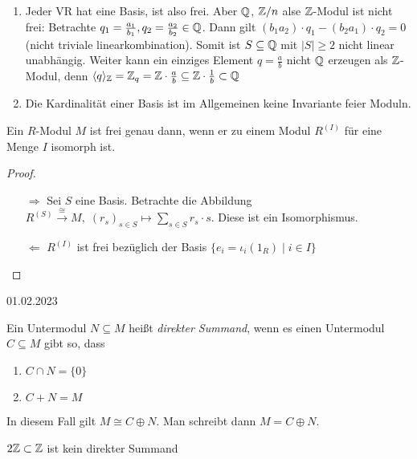 \documentclass[../main.tex]{subfiles}
\begin{document}
\begin{remark}$ $
    \begin{enumerate}[label=\alph*)]
        \item Jeder VR hat eine Basis, ist also frei.
        Aber $\mathbb{Q}$, $\mathbb{Z}/n$ alse $\mathbb{Z}$-Modul ist nicht frei:
        Betrachte $q_1 = \frac{a_1}{b_1},q_2=\frac{a_2}{b_2}\in \mathbb{Q}$. Dann gilt $(b_1a_2)\cdot q_1 - (b_2a_1)\cdot q_2 = 0$ (nicht triviale linearkombination).
        Somit ist $S\subseteq \mathbb{Q}$ mit $|S|\geq 2$ nicht linear unabhängig.
        Weiter kann ein einziges Element $q=\frac{a}{b}$ nicht $\mathbb{Q}$ erzeugen als $\mathbb{Z}$-Modul, denn $\langle q\rangle_{\mathbb{Z}} = \mathbb{Z}_q = \mathbb{Z}\cdot \frac{a}{b}\subseteq \mathbb{Z}\cdot \frac{1}{b} \subset \mathbb{Q}$
        \item Die Kardinalität einer Basis ist im Allgemeinen keine Invariante feier Moduln.
    \end{enumerate}
\end{remark}

\begin{lemma}
    Ein $R$-Modul $M$ ist frei genau dann, wenn er zu einem Modul $R^{(I)}$ für eine Menge $I$ isomorph ist.
\end{lemma}
\begin{proof} $ $
    \begin{itemize}
        \item[$\Rightarrow$]
        Sei $S$ eine Basis. Betrachte die Abbildung $R^{(S)}\overset{\cong}{\rightarrow} M,\; (r_s)_{s\in S} \mapsto \sum_{s\in S} r_s\cdot s$. Diese ist ein Isomorphismus.
        \item[$\Leftarrow$]
        $R^{(I)}$ ist frei bezüglich der Basis $\{e_i =\iota_i(1_R)\mid i\in I\}$
    \end{itemize}
\end{proof}

\begin{flushright}
    01.02.2023
\end{flushright}
\begin{definition}
    Ein Untermodul $N\subseteq M$ heißt \emph{direkter Summand}, wenn es einen Untermodul $C\subseteq M$ gibt so, dass
    \begin{enumerate}[label=(\roman*)]
        \item $C\cap N = \{0\}$
        \item $C+N=M$
    \end{enumerate}
    In diesem Fall gilt $M\cong C\oplus N$.
    Man schreibt dann $M=C \oplus N$.
\end{definition}
\begin{example*}
    $2\mathbb{Z} \subset \mathbb{Z}$ ist kein direkter Summand
\end{example*}
\end{document}
